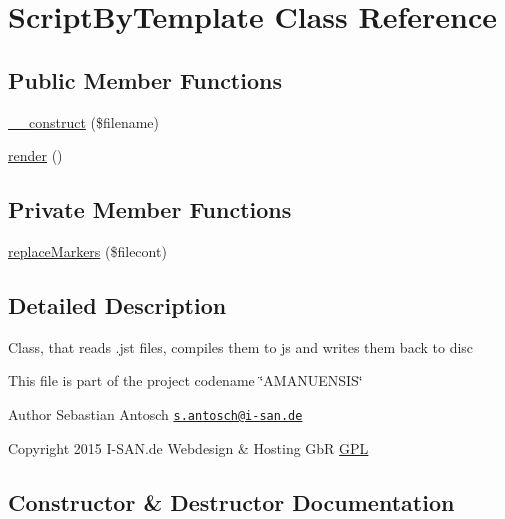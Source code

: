 \hypertarget{class_script_by_template}{}\section{Script\+By\+Template Class Reference}
\label{class_script_by_template}
\subsection*{Public Member Functions}
\begin{DoxyCompactItemize}
\item 
\hyperlink{class_script_by_template_a3387125924c13e72878c47ecad75faca}{\+\_\+\+\_\+construct} (\$filename)
\item 
\hyperlink{class_script_by_template_afde88292c44dc59faf017738dae6dffb}{render} ()
\end{DoxyCompactItemize}
\subsection*{Private Member Functions}
\begin{DoxyCompactItemize}
\item 
\hyperlink{class_script_by_template_ab5fc580656acd4c894f79ae7f25b3ab3}{replace\+Markers} (\$filecont)
\end{DoxyCompactItemize}


\subsection{Detailed Description}
Class, that reads .jst files, compiles them to js and writes them back to disc

This file is part of the project codename \char`\"{}\+A\+M\+A\+N\+U\+E\+N\+S\+I\+S\char`\"{}

\begin{DoxyAuthor}{Author}
Sebastian Antosch \href{mailto:s.antosch@i-san.de}{\tt s.\+antosch@i-\/san.\+de} 
\end{DoxyAuthor}
\begin{DoxyCopyright}{Copyright}
2015 I-\/\+S\+A\+N.\+de Webdesign \& Hosting Gb\+R \hyperlink{}{G\+P\+L }
\end{DoxyCopyright}


\subsection{Constructor \& Destructor Documentation}
\hypertarget{class_script_by_template_a3387125924c13e72878c47ecad75faca}{}
